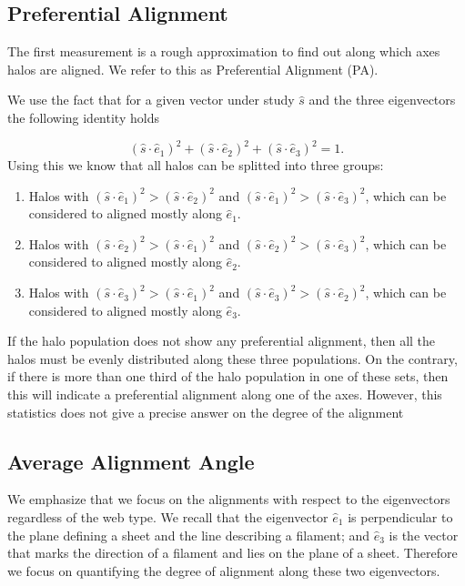 \documentclass[useAMS,usenatbib]{mn2e}
\begin{document}
\subsection{Preferential Alignment}

The first measurement is a rough approximation to find out along which
axes halos are aligned. We refer to this as Preferential Alignment (PA).

We use the fact that for a given vector under study $\hat{s}$ and the
three eigenvectors the following identity holds 
 
\begin{equation}
(\hat{s}\cdot\hat{e}_1)^2 +(\hat{s}\cdot\hat{e}_2)^2 +(\hat{s}\cdot\hat{e}_3)^2 =1.
\end{equation}
%
Using this we know that all halos can be splitted into three groups:

\begin{enumerate}
\item Halos with $(\hat{s}\cdot\hat{e}_1)^2> (\hat{s}\cdot\hat{e}_2)^2$
  and $(\hat{s}\cdot\hat{e}_1)^2> (\hat{s}\cdot\hat{e}_3)^2$, which can
  be considered to aligned mostly along $\hat{e}_1$.
\item Halos with $(\hat{s}\cdot\hat{e}_2)^2> (\hat{s}\cdot\hat{e}_1)^2$
  and $(\hat{s}\cdot\hat{e}_2)^2> (\hat{s}\cdot\hat{e}_3)^2$, which can
  be considered to aligned mostly along $\hat{e}_2$.
\item Halos with $(\hat{s}\cdot\hat{e}_3)^2> (\hat{s}\cdot\hat{e}_1)^2$
  and $(\hat{s}\cdot\hat{e}_3)^2> (\hat{s}\cdot\hat{e}_2)^2$, which can
  be considered to aligned mostly along $\hat{e}_3$.
\end{enumerate}

If the halo population does not show any preferential alignment, then
all the halos must be evenly distributed along these three
populations. On the contrary, if there is more than one third of the
halo population in one of these sets, then this will indicate a
preferential alignment along one of the axes. However, this statistics
does not give a precise answer on the degree of the alignment


\subsection{Average Alignment Angle}

We emphasize that we focus on the alignments with respect to the
eigenvectors regardless of the web type. We recall that the
eigenvector $\hat{e}_1$ is perpendicular to the plane defining a sheet
and the line describing a filament; and $\hat{e}_3$ is the vector that
marks the direction of a filament and lies on the plane of a
sheet. Therefore we focus on quantifying the degree of alignment along
these two eigenvectors. 
\end{document}
